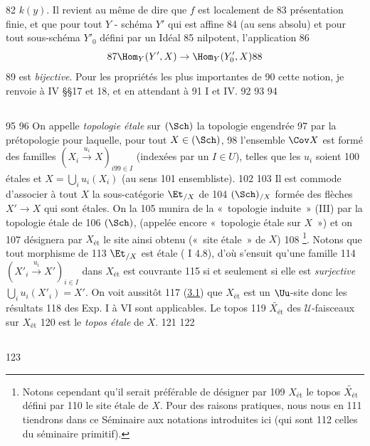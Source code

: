     82	$k(y)$. Il revient au même de dire que $f$ est localement de
    83	présentation finie, et que pour tout $Y$ - schéma $Y'$ qui est affine
    84	(au sens absolu) et pour tout sous-schéma $Y'_{0}$ défini par un Idéal
    85	nilpotent, l'application
    86	$$
    87	\Hom_Y (Y', X) \to \Hom_Y (Y'_{0}, X)
    88	$$
    89	est \emph{bijective}. Pour les propriétés les plus importantes de
    90	cette notion, je renvoie à \EGA IV \S\S 17 et 18, et en attendant à
    91	 I et IV.
    92	
    93	
    94	\subsection{}
    95	
    96	On appelle \emph{topologie étale} sur $(\Sch)$ la topologie engendrée
    97	par la prétopologie pour laquelle, pour tout $X \in (\Sch)$,
    98	l'ensemble $\Cov X$ est formé des familles $(X_i \xrightarrow{u_i} X)_{i
    99	\in I}$ (indexées par un $I \in U$), telles que les $u_i$ soient
   100	étales et $X = \bigcup_{i} u_i (X_i)$ (au sens
   101	ensembliste).
   102	
   103	Il est commode d'associer à tout $X$ la sous-catégorie $\Et_{/X}$ de
   104	$(\Sch)_{/X}$ formée des flèches $X'\to X$ qui sont étales. On la
   105	munira de la « topologie induite » (III) par la topologie étale de
   106	$(\Sch)$, (appelée encore « topologie étale sur $X$ ») et on
   107	désignera par $X_{\text{ét}}$ le site ainsi obtenu (« site étale » de $X$)
   108	\footnote{Notons cependant qu'il serait préférable de désigner par
   109	  $X_{\text{ét}}$ le topos $\widetilde{X_{\text{ét}}}$ défini par
   110	  le site étale de $X$. Pour des raisons pratiques, nous nous en
   111	  tiendrons dans ce Séminaire aux notations introduites ici (qui sont
   112	  celles du séminaire primitif).}. Notons que tout morphisme de
   113	$\Et_{/X}$ est étale ( I 4.8), d'où s'ensuit qu'une famille
   114	$(X'_i \xrightarrow{u_i} X')_{i \in I}$ dans $X_{\text{ét}}$ est couvrante
   115	si et seulement si elle est \emph{surjective} 	$\bigcup_{i} u_{i}(X'_{i}) = X'$. On voit aussitôt
   117	(\cf \hyperref[VII.prop3.1]{3.1}) que $X_{\text{ét}}$ est un $\Uu$-site donc les résultats
   118	des Exp. I à VI sont applicables. Le topos
   119	$\widetilde{X_{\text{ét}}}$ des $𝒰$-faisceaux sur $X_{\text{ét}}$
   120	est le \emph{topos étale} de $X$.
   121	
   122	\subsection{}
   123	
